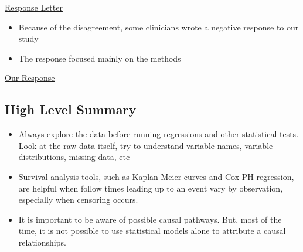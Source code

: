 \documentclass[
]{article}
\providecommand{\tightlist}{%
  \setlength{\itemsep}{0pt}\setlength{\parskip}{0pt}}
\begin{document}
\href{http://citeseerx.ist.psu.edu/viewdoc/download?doi=10.1.1.864.7969\&rep=rep1\&type=pdf}{Response
Letter}

\begin{itemize}
\tightlist
\item
  Because of the disagreement, some clinicians wrote a negative response
  to our study
\item
  The response focused mainly on the methods
\end{itemize}

\href{https://academic.oup.com/cid/article/60/9/1444/404706}{Our
Response}

\hypertarget{high-level-summary}{%
\subsection{High Level Summary}\label{high-level-summary}}

\begin{itemize}
\tightlist
\item
  Always explore the data before running regressions and other
  statistical tests. Look at the raw data itself, try to understand
  variable names, variable distributions, missing data, etc
\item
  Survival analysis tools, such as Kaplan-Meier curves and Cox PH
  regression, are helpful when follow times leading up to an event vary
  by observation, especially when censoring occurs.
\item
  It is important to be aware of possible causal pathways. But, most of
  the time, it is not possible to use statistical models alone to
  attribute a causal relationships.
\end{itemize}
\end{document}
